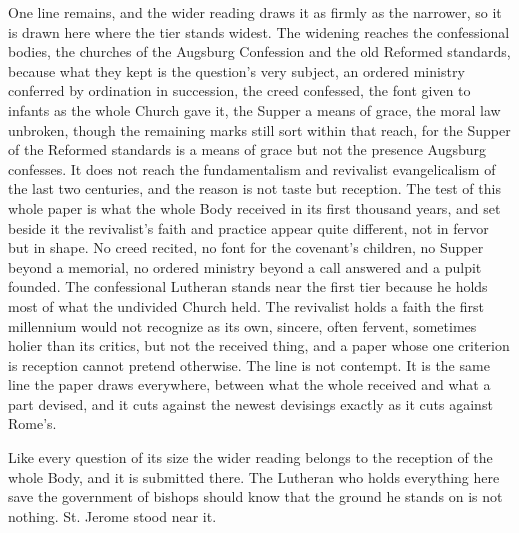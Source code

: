 One line remains, and the wider reading draws it as firmly as the narrower, so it is drawn here where the tier stands widest. The widening reaches the confessional bodies, the churches of the Augsburg Confession and the old Reformed standards, because what they kept is the question's very subject, an ordered ministry conferred by ordination in succession, the creed confessed, the font given to infants as the whole Church gave it, the Supper a means of grace, the moral law unbroken, though the remaining marks still sort within that reach, for the Supper of the Reformed standards is a means of grace but not the presence Augsburg confesses. It does not reach the fundamentalism and revivalist evangelicalism of the last two centuries, and the reason is not taste but reception. The test of this whole paper is what the whole Body received in its first thousand years, and set beside it the revivalist's faith and practice appear quite different, not in fervor but in shape. No creed recited, no font for the covenant's children, no Supper beyond a memorial, no ordered ministry beyond a call answered and a pulpit founded. The confessional Lutheran stands near the first tier because he holds most of what the undivided Church held. The revivalist holds a faith the first millennium would not recognize as its own, sincere, often fervent, sometimes holier than its critics, but not the received thing, and a paper whose one criterion is reception cannot pretend otherwise. The line is not contempt. It is the same line the paper draws everywhere, between what the whole received and what a part devised, and it cuts against the newest devisings exactly as it cuts against Rome's.

Like every question of its size the wider reading belongs to the reception of the whole Body, and it is submitted there. The Lutheran who holds everything here save the government of bishops should know that the ground he stands on is not nothing. St. Jerome stood near it.
